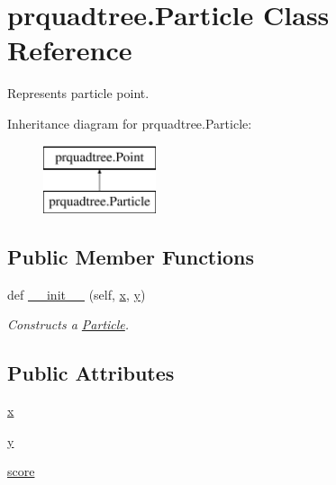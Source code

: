 \section{prquadtree.\+Particle Class Reference}
\label{classprquadtree_1_1Particle}


Represents particle point.  


Inheritance diagram for prquadtree.\+Particle\+:\begin{figure}[H]
\begin{center}
\leavevmode
\includegraphics[height=2.000000cm]{classprquadtree_1_1Particle}
\end{center}
\end{figure}
\subsection*{Public Member Functions}
\begin{DoxyCompactItemize}
\item 
def \hyperlink{classprquadtree_1_1Particle_a4508876870d2813145a26fb581ce06f4}{\+\_\+\+\_\+init\+\_\+\+\_\+} (self, \hyperlink{classprquadtree_1_1Particle_a749ee47de3358225c48e7b8d4dc85ded}{x}, \hyperlink{classprquadtree_1_1Particle_ab4bcb8c94d6976d2050749590ad41210}{y})
\begin{DoxyCompactList}\small\item\em Constructs a \hyperlink{classprquadtree_1_1Particle}{Particle}. \end{DoxyCompactList}\end{DoxyCompactItemize}
\subsection*{Public Attributes}
\begin{DoxyCompactItemize}
\item 
\hyperlink{classprquadtree_1_1Particle_a749ee47de3358225c48e7b8d4dc85ded}{x}
\item 
\hyperlink{classprquadtree_1_1Particle_ab4bcb8c94d6976d2050749590ad41210}{y}
\item 
\hyperlink{classprquadtree_1_1Particle_a9fc6fbbd51a3dc21b0dc2531c6c6ff1b}{score}
\end{DoxyCompactItemize}



